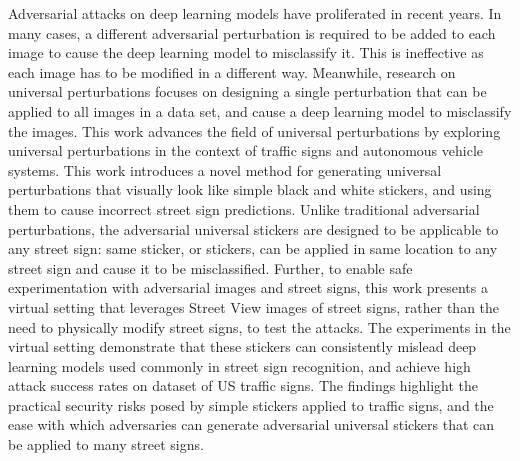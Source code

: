 Adversarial attacks on deep learning models have proliferated in recent years. In many cases, a different adversarial perturbation is required to be added to each image to cause the deep learning model to misclassify it. This is ineffective as each image has to be modified in a different way. Meanwhile, research on universal perturbations focuses on designing a single perturbation that can be applied to all images in a data set, and cause a deep learning model to misclassify the images. This work advances the field of universal perturbations by exploring universal perturbations in the context of traffic signs and autonomous vehicle systems. This work introduces a novel method for generating universal perturbations that visually look like simple black and white stickers, and using them to cause incorrect street sign predictions. Unlike traditional adversarial perturbations, the adversarial universal stickers are designed to be applicable to any street sign: same sticker, or stickers, can be applied in same location to any street sign and cause it to be misclassified. Further, to enable safe experimentation with adversarial images and street signs, this work presents a virtual setting that leverages Street View images of street signs, rather than the need to physically modify street signs, to test the attacks. The experiments in the virtual setting demonstrate that these stickers can consistently mislead deep learning models used commonly in street sign recognition, and achieve high attack success rates on dataset of US traffic signs. The findings highlight the practical security risks posed by simple stickers applied to traffic signs, and the ease with which adversaries can generate adversarial universal stickers that can be applied to many street signs.